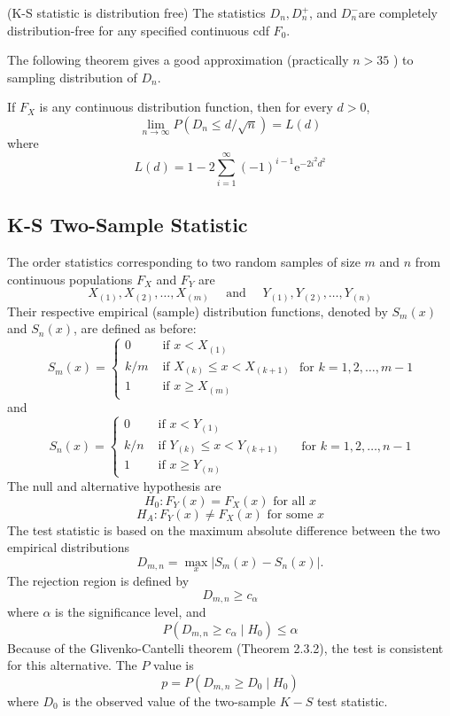 \begin{theorem}
	(K-S statistic is distribution free)
	The statistics $D_n, D_n^{+}$, and $D_n^{-}$are completely distribution-free for any specified continuous cdf $F_0$.
\end{theorem}

The following theorem gives a good approximation (practically $n>35$ ) to sampling distribution of $D_n$.
\begin{theorem}
	If $F_X$ is any continuous distribution function, then for every $d>0$,
\[
\lim _{n \rightarrow \infty} P\left(D_n \leq d / \sqrt{n}\right)=L(d)
\]
where
\[
L(d)=1-2 \sum_{i=1}^{\infty}(-1)^{i-1} \mathrm{e}^{-2 i^2 d^2}
\]
\end{theorem}

\subsection{K-S Two-Sample Statistic}

The order statistics corresponding to two random samples of size $m$ and $n$ from continuous populations $F_X$ and $F_Y$ are
\[
X_{(1)}, X_{(2)}, \ldots, X_{(m)} \quad \text { and } \quad Y_{(1)}, Y_{(2)}, \ldots, Y_{(n)}
\]
Their respective empirical (sample) distribution functions, denoted by $S_m(x)$ and $S_n(x)$, are defined as before:
\[
S_m(x)=\left\{\begin{array}{ll}
0 & \text { if } x<X_{(1)} \\
k / m & \text { if } X_{(k)} \leq x<X_{(k+1)} \\
1 & \text { if } x \geq X_{(m)}
\end{array} \text { for } k=1,2, \ldots, m-1\right.
\]
and
\[
S_n(x)=\left\{\begin{array}{ll}
0 & \text { if } x<Y_{(1)} \\
k / n & \text { if } Y_{(k)} \leq x<Y_{(k+1)} \\
1 & \text { if } x \geq Y_{(n)}
\end{array} \quad \text { for } k=1,2, \ldots, n-1\right.
\]
The null and alternative hypothesis are
\[
H_0: F_Y(x)=F_X(x) \text { for all } x
\]
\[
H_A: F_Y(x)\neq F_X(x) \text { for some } x
\]
The test statistic is based on the maximum absolute difference between the two empirical distributions
\[
	D_{m, n}=\max _x\left|S_m(x)-S_n(x)\right|
.\] 
The rejection region is defined by 
\[
	D_{m,n}\ge c_\alpha
\] 
where $\alpha$ is the significance level, and
\[
P\left(D_{m, n} \geq c_\alpha \mid H_0\right) \leq \alpha
\]
Because of the Glivenko-Cantelli theorem (Theorem 2.3.2), the test is consistent for this alternative. The $P$ value is
\[
p = P\left(D_{m, n} \geq D_0 \mid H_0\right)
\]
where $D_0$ is the observed value of the two-sample $K-S$ test statistic.




